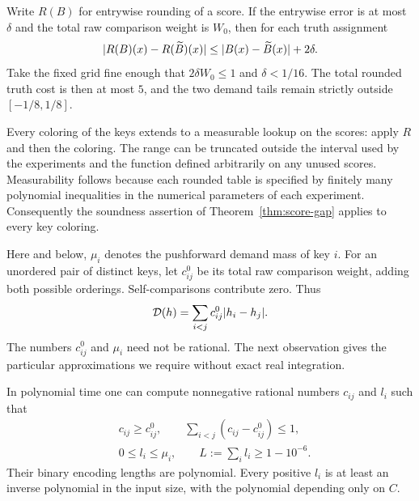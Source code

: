 Write $R(B)$ for entrywise rounding of a score.  If the entrywise error is at
most $\delta$ and the total raw comparison weight is $W_0$, then for each
truth assignment
\[
 \lvert R(B)(x)-R(\widetilde B)(x)\rvert
 \le \lvert B(x)-\widetilde B(x)\rvert+2\delta.
\]
Take the fixed grid fine enough that $2\delta W_0\le1$ and $\delta<1/16$.
The total rounded truth cost is then at most $5$, and the two demand tails
remain strictly outside $[-1/8,1/8]$.

Every coloring of the keys extends to a measurable lookup on the scores:
apply $R$ and then the coloring.  The range can be truncated outside the
interval used by the experiments and the function defined arbitrarily on
any unused scores.  Measurability follows because each rounded table is
specified by finitely many polynomial inequalities in the numerical
parameters of each experiment.  Consequently the soundness assertion of
Theorem~\ref{thm:score-gap} applies to every key coloring.

Here and below, $\mu_i$ denotes the pushforward demand mass of key $i$.
For an unordered pair of distinct keys, let $c^0_{ij}$ be its total raw
comparison weight, adding both possible orderings.  Self-comparisons
contribute zero.  Thus
\begin{equation}\label{eq:raw-capacities}
 \mathcal D(h)=\sum_{i<j}c^0_{ij}\lvert h_i-h_j\rvert.
\end{equation}
The numbers $c^0_{ij}$ and $\mu_i$ need not be rational.  The next observation
gives the particular approximations we require without exact real integration.

\begin{lemma}\label{lem:rational-compilation}
In polynomial time one can compute nonnegative rational numbers $c_{ij}$
and $l_i$ such that
\begin{align}
 &c_{ij}\ge c^0_{ij},\qquad
   \sum_{i<j}(c_{ij}-c^0_{ij})\le1,\label{eq:capacity-upper}\\
 &0\le l_i\le\mu_i,\qquad L:=\sum_i l_i\ge1-10^{-6}.
   \label{eq:demand-lower}
\end{align}
Their binary encoding lengths are polynomial.  Every positive $l_i$ is at
least an inverse polynomial in the input size, with the polynomial depending
only on $C$.
\end{lemma}

